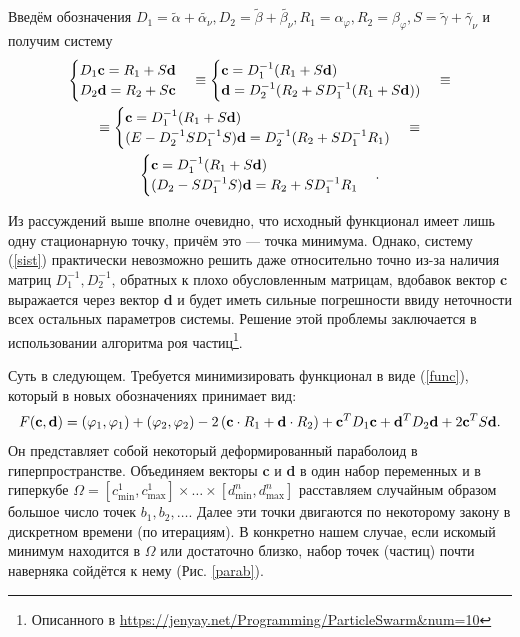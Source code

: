 \documentclass[a4paper]{article}
\begin{document}
Введём обозначения $D_1=\tilde{\alpha}+\tilde{\alpha_{\nu}}, D_2=\tilde{\beta}+\tilde{\beta_{\nu}}, R_1=\alpha_{\varphi}, R_2= \beta_{\varphi}, S=\tilde{\gamma}+\tilde{\gamma_{\nu}}$
и получим систему
\begin{multline}
  \begin{cases}
    D_1 {\bf c}= R_1 + S{\bf d} \\
    D_2 {\bf d}= R_2 + S{\bf c}
  \end{cases}\equiv
  \begin{cases}
    {\bf c}=D_1^{-1} (R_1 + S{\bf d}) \\
    {\bf d}= D_2^{-1}(R_2 + SD_1^{-1} (R_1 + S{\bf d}))
  \end{cases}\equiv\\
  \equiv
  \begin{cases}
    {\bf c}=D_1^{-1} (R_1 + S{\bf d}) \\
    (E-D_2^{-1}SD_1^{-1}S) {\bf d}= D_2^{-1}(R_2 + SD_1^{-1} R_1)
  \end{cases}
  \equiv\\
  \begin{cases}
    {\bf c}=D_1^{-1} (R_1 + S{\bf d}) \\
    (D_2-SD_1^{-1}S) {\bf d}=R_2 + SD_1^{-1} R_1
  \end{cases}.
  \label{sist}
\end{multline}

Из рассуждений выше вполне очевидно, что исходный функционал имеет лишь одну стационарную точку, причём это --- точка минимума.
Однако, систему (\ref{sist}) практически невозможно решить даже относительно точно из-за наличия матриц $D_1^{-1}, D_2^{-1}$, обратных к плохо обусловленным матрицам, вдобавок
вектор {\bf c} выражается через вектор {\bf d} и будет иметь сильные погрешности ввиду неточности всех остальных параметров системы.
Решение этой проблемы заключается в использовании алгоритма роя частиц\footnote{Описанного в \url{https://jenyay.net/Programming/ParticleSwarm&num=10}}.

Суть в следующем. Требуется минимизировать функционал в виде (\ref{func}), который в новых обозначениях принимает вид:
\begin{equation}
  F({\bf c},{\bf d})=(\varphi_1,\varphi_1)+(\varphi_2,\varphi_2)-2\left({\bf c}\cdot R_1+{\bf d}\cdot R_2\right)+
  {\bf c}^T D_1 {\bf c}+{\bf d}^T D_2 {\bf d}+2{\bf c}^T S {\bf d}.
\end{equation}
Он представляет собой некоторый деформированный параболоид в гиперпространстве.
Объединяем векторы {\bf c} и {\bf d} в один набор переменных и в гиперкубе $\Omega=[c^1_{\min},c^1_{\max}] \times \dots \times [d^n_{\min},d^n_{\max}]$
расставляем случайным образом большое число точек $b_1, b_2, \dots$.
Далее эти точки двигаются по некоторому закону в дискретном времени (по итерациям).
В конкретно нашем случае, если искомый минимум находится в $\Omega$ или достаточно близко, набор точек (частиц) почти наверняка сойдётся к нему (Рис. \ref{parab}).
\end{document}
